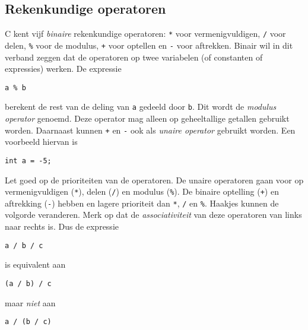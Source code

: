 \subsection{Rekenkundige operatoren}
C kent vijf \textsl{binaire} rekenkundige operatoren: \texttt{*} voor vermenigvuldigen, \texttt{/} voor delen, \texttt{\%} voor de modulus, \texttt{+} voor optellen en \texttt{-} voor aftrekken. Binair wil in dit verband zeggen dat de operatoren op twee variabelen (of constanten of expressies) werken. 
De expressie

\hspace*{1em}\texttt{a \% b}

berekent de rest van de deling van \texttt{a} gedeeld door \texttt{b}. Dit wordt de \textsl{modulus operator} genoemd. Deze operator mag alleen op geheeltallige getallen gebruikt worden. Daarnaast kunnen \texttt{+} en \texttt{-} ook als \textsl{unaire operator} gebruikt worden. Een voorbeeld hiervan is

\hspace*{1em}\texttt{int a = -5;}

Let goed op de prioriteiten van de operatoren. De unaire operatoren gaan voor op vermenigvuldigen (\texttt{*}), delen (\texttt{/}) en modulus (\texttt{\%}). De binaire optelling (\texttt{+}) en aftrekking (\texttt{-}) hebben en lagere prioriteit dan \texttt{*}, \texttt{/} en \texttt{\%}. Haakjes kunnen de volgorde veranderen. Merk op dat de \textsl{associativiteit} van deze operatoren van links naar rechts is. Dus de expressie

\hspace*{1em}\texttt{a / b / c}

is equivalent aan

\hspace*{1em}\texttt{(a / b) / c}
 
maar \textsl{niet} aan

\hspace*{1em}\texttt{a / (b / c)}


